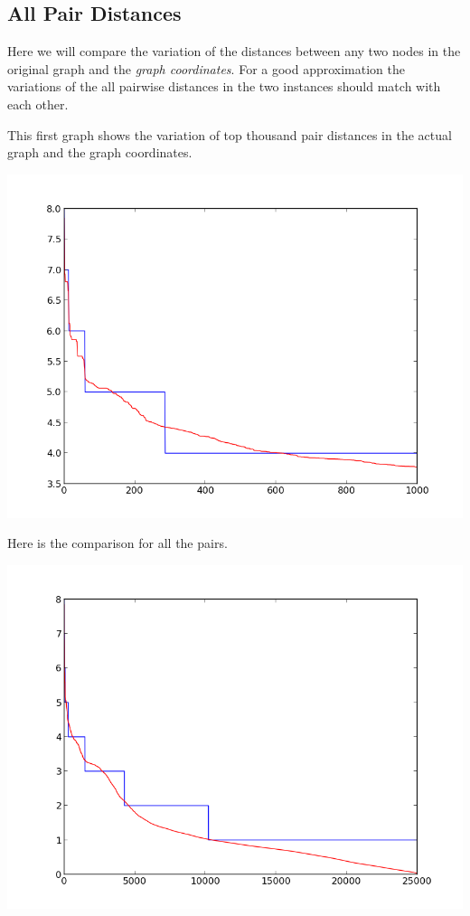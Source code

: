 \documentclass{article}
\begin{document}
        \subsection{All Pair Distances}
        
            Here we will compare the variation of the distances between any two nodes in the original graph and the {\em graph coordinates}. For a good approximation the variations of the all pairwise distances in the two instances should match with each other.
            
            This first graph shows the variation of top thousand pair distances in the actual graph and the graph coordinates.
            
            \noindent \includegraphics[scale=0.8]{pairs_top_1000.png}
            
            Here is the comparison for all the pairs.
            
            \includegraphics[scale=0.8]{total_pairs.png}
            
\end{document}
